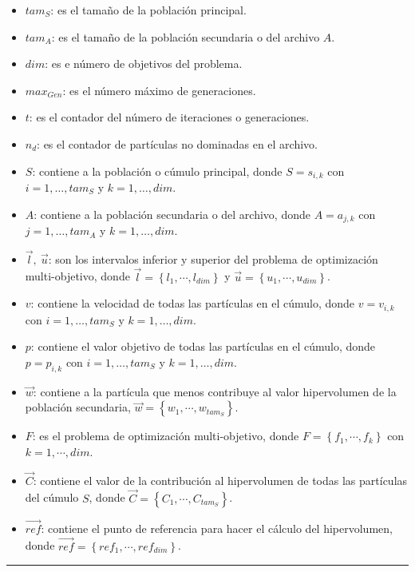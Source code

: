  \begin{itemize}
    \item $tam_S$: es el tama\~no de la poblaci\'on principal.
    \item $tam_A$: es el tama\~no de la poblaci\'on secundaria o del archivo $A$.
    \item $dim$: es e n\'umero de objetivos del problema.
    \item $max_{Gen}$: es el n\'umero m\'aximo de generaciones.
    \item $t$: es el contador del n\'umero de iteraciones o generaciones.
    \item $n_d$: es el contador de part\'iculas no dominadas en el archivo.
    \item $S$: contiene a la poblaci\'on o c\'umulo principal, donde $S = s_{i,k}$ con $i= 1, \ldots, tam_S$ y $k = 1,\ldots, dim$.  
    \item $A$: contiene a la poblaci\'on secundaria o del archivo, donde $A= a_{j,k}$ con $j = 1, \ldots, tam_A$ y $k = 1,\ldots, dim$.
    \item $\vec{l},\ \vec{u}$: son los intervalos inferior y superior del problema de optimizaci\'on multi-objetivo, donde $\vec{l}=\left\{l_1,\cdots,l_{dim} \right\}$ y 
    $\vec{u}=\left\{u_1,\cdots,u_{dim} \right\}$.
    \item $v$: contiene la velocidad de todas las part\'iculas en el c\'umulo, donde $v=v_{i,k}$ con $i= 1, \ldots, tam_S$ y $k = 1,\ldots, dim$.
    \item $p$: contiene el valor objetivo de todas las part\'iculas en el c\'umulo, donde $p=p_{i,k}$ con $i= 1, \ldots, tam_S$ y $k = 1,\ldots, dim$.
    \item $\vec{w}$: contiene a la part\'icula que menos contribuye al valor hipervolumen de la poblaci\'on secundaria, 
    $\vec{w}=\left\{w_1,\cdots,w_{tam_S} \right\}$.
    \item $F$: es el problema de optimizaci\'on multi-objetivo, donde $F =\left\{ f_1,\cdots,f_k\right\}$ con $k = 1,\cdots, dim$.
    \item $\vec{C}$: contiene el valor de la contribuci\'on al hipervolumen de todas las part\'iculas del c\'umulo $S$, donde 
    $\vec{C}=\left\{C_1,\cdots,C_{tam_S} \right\}$. 
    \item $\vec{ref}$: contiene el punto de referencia para hacer el c\'alculo del hipervolumen, donde 
    $\vec{ref}=\left\{ref_1,\cdots,ref_{dim} \right\}$.
  \end{itemize}
  \rule{\linewidth}{1pt}
  
